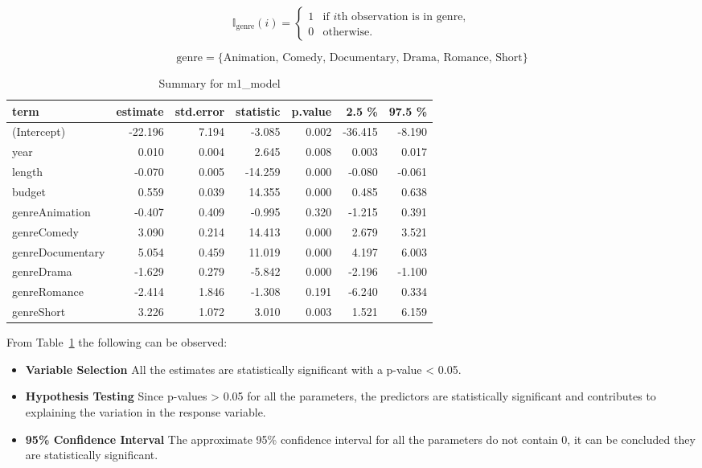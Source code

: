 \documentclass[
  letterpaper,
  DIV=11,
  numbers=noendperiod]{scrartcl}
\begin{document}
\[\mathbb{I}_{\textrm{genre}}(i) = \begin{cases}
1 & \textrm{if } i\textrm{th observation is in genre}, \\
0 & \textrm{otherwise}.
\end{cases}\]

\[\textrm{genre} = \{\textrm{Animation, Comedy, Documentary, Drama, Romance, Short}\}\]
\clearpage

\hypertarget{tbl-m1_model-Summary}{}
\begin{longtable}{lrrrrrr}
\caption{\label{tbl-m1_model-Summary}Summary for m1\_model }\tabularnewline

\toprule
term & estimate & std.error & statistic & p.value & 2.5 \% & 97.5 \% \\ 
\midrule\addlinespace[2.5pt]
(Intercept) & -22.196 & 7.194 & -3.085 & 0.002 & -36.415 & -8.190 \\ 
year & 0.010 & 0.004 & 2.645 & 0.008 & 0.003 & 0.017 \\ 
length & -0.070 & 0.005 & -14.259 & 0.000 & -0.080 & -0.061 \\ 
budget & 0.559 & 0.039 & 14.355 & 0.000 & 0.485 & 0.638 \\ 
genreAnimation & -0.407 & 0.409 & -0.995 & 0.320 & -1.215 & 0.391 \\ 
genreComedy & 3.090 & 0.214 & 14.413 & 0.000 & 2.679 & 3.521 \\ 
genreDocumentary & 5.054 & 0.459 & 11.019 & 0.000 & 4.197 & 6.003 \\ 
genreDrama & -1.629 & 0.279 & -5.842 & 0.000 & -2.196 & -1.100 \\ 
genreRomance & -2.414 & 1.846 & -1.308 & 0.191 & -6.240 & 0.334 \\ 
genreShort & 3.226 & 1.072 & 3.010 & 0.003 & 1.521 & 6.159 \\ 
\bottomrule
\end{longtable}

From Table~\ref{tbl-m1_model-Summary} the following can be observed:

\begin{itemize}
\item
  \textbf{Variable Selection} All the estimates are statistically
  significant with a p-value \textless{} 0.05.
\item
  \textbf{Hypothesis Testing} Since p-values \textgreater{} 0.05 for all
  the parameters, the predictors are statistically significant and
  contributes to explaining the variation in the response variable.
\item
  \textbf{95\% Confidence Interval} The approximate 95\% confidence
  interval for all the parameters do not contain 0, it can be concluded
  they are statistically significant.
\end{itemize}
\end{document}
